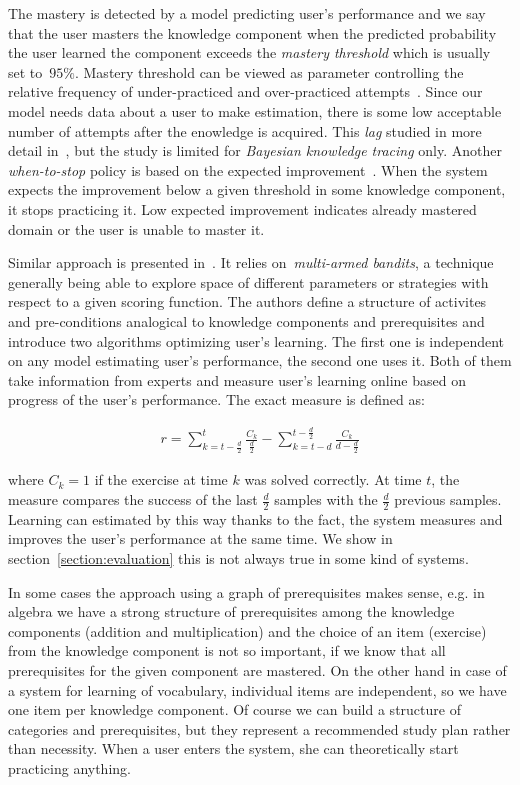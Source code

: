 \documentclass[table,color]{fithesis3/fithesis3}
\begin{document}
The mastery is detected by a model predicting user's performance and we say
that the user masters the knowledge component when the predicted probability
the user learned the component exceeds the \emph{mastery threshold} which is
usually set to~$95\%$. Mastery threshold can be viewed as parameter controlling
the relative frequency of under-practiced and over-practiced
attempts~\cite{fancsali2013optimal}. Since our model needs data about a user
to make estimation, there is some low acceptable number of attempts after the
enowledge is acquired. This \emph{lag} studied in more detail
in~\cite{fancsali2013optimal}, but the study is limited for \emph{Bayesian
knowledge tracing} only. Another \emph{when-to-stop} policy is based on the
expected improvement~\cite{rollinson2015predictive}. When the system expects
the improvement below a given threshold in some knowledge component, it stops
practicing it. Low expected improvement indicates already mastered domain or
the user is unable to master it.

Similar approach is presented in~\cite{lopes2015multi}. It relies
on~\emph{multi-armed bandits}, a technique generally being able to explore
space of different parameters or strategies with respect to a given scoring
function. The authors define a structure of activites and pre-conditions
analogical to knowledge components and prerequisites and introduce two
algorithms optimizing user's learning. The first one is independent on any
model estimating user's performance, the second one uses it. Both of them take
information from experts and measure user's learning online based on progress
of the user's performance. The exact measure is defined as:

\begin{align}
	r = \sum^{t}_{k = t - \frac{d}{2}} \frac{C_k}{\frac{d}{2}} - \sum^{t - \frac{d}{2}}_{k = t - d} \frac{C_k}{d - \frac{d}{2}}
\end{align}

where $C_k = 1$ if the exercise at time $k$ was solved correctly. At time $t$,
the measure compares the success of the last $\frac{d}{2}$ samples with the
$\frac{d}{2}$ previous samples. Learning can estimated by this way thanks to
the fact, the system measures and improves the user's performance at the same
time. We show in section~\ref{section:evaluation} this is not always true in
some kind of systems.

In some cases the approach using a graph of prerequisites makes sense, e.g.
in algebra we have a strong structure of prerequisites among the knowledge
components (addition and multiplication) and the choice of an item (exercise)
from the knowledge component is not so important, if we know that all
prerequisites for the given component are mastered. On the other hand in case
of a system for learning of vocabulary, individual items are independent, so we
have one item per knowledge component. Of course we can build a structure of
categories and prerequisites, but they represent a recommended study plan
rather than necessity. When a user enters the system, she can theoretically
start practicing anything.
\end{document}
